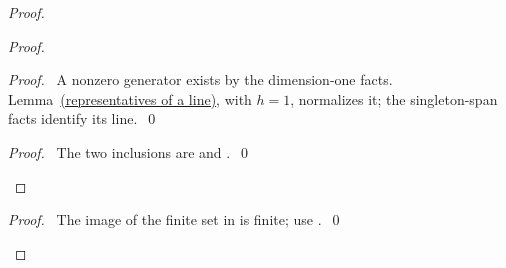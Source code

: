 \begin{mergedproofsection}
\begin{proof}
\begin{proof}
 \begin{proof}\pf\ A nonzero generator exists by the dimension-one
 facts. Lemma~\hyperref[lem:312-representatives]{(representatives of a line)}, with $h=1$, normalizes it;
 the singleton-span facts identify its line.~\qed\end{proof}
 \qedstep
 \begin{proof}\pf\ The two inclusions are 
 and .~\qed\end{proof}
\end{proof}
\qedstep
\begin{proof}\pf\ The image of the finite set in 
is finite; use .~\qed\end{proof}
\end{proof}


\end{mergedproofsection}
